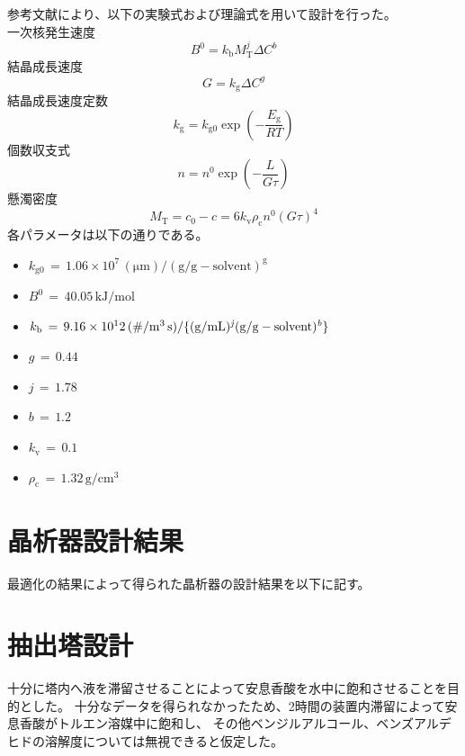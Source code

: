 \documentclass[a4j]{jsreport}
\begin{document}
参考文献\cite{晶析}により、以下の実験式および理論式を用いて設計を行った。\\
一次核発生速度
\begin{equation}
    B^0 = k_{\mathrm{ b}}M_{\mathrm{ T}}^j \Delta C^b
\end{equation}
結晶成長速度
\begin{equation}
    G = k_{\mathrm{ g}}\Delta C^g
\end{equation}
結晶成長速度定数
\begin{equation}
    k_{\mathrm{ g}} = k_{\mathrm{ g0}} \exp(-\frac{E_{\mathrm{ g}}}{RT})
\end{equation}
個数収支式
\begin{equation}
    n=n^0 \exp(-\frac{L}{G\tau})
\end{equation}
懸濁密度
\begin{equation}
    M_{\mathrm{ T}} = c_0-c = 6k_{\mathrm{ v}}\rho_{\mathrm{ c}}n^0(G\tau)^4
\end{equation}
各パラメータは以下の通りである。
\begin{itemize}
    \item[] $k_{\mathrm{ g0}}\,=\,1.06\times10^7\,\mathrm{ (\mu m)/(g/g-solvent)^g}$
    \item[] $B^{\mathrm{ 0}}\,=\,40.05\,\mathrm{ kJ/mol}$
    \item[] $k_{\mathrm{ b}}\,=\,9.16\times10^12\,\mathrm{ (\#/ m^3\,s)/\{(g/mL)^{{\it j}}(g/g-solvent)^{{\it b}}\}}$
    \item[] $g\,=\,0.44\,$
    \item[] $j\,=\,1.78\,$
    \item[] $b\,=\,1.2\,$
    \item[] $k_{\mathrm{ v}}\,=\,0.1\,$
    \item[] $\rho_{\mathrm{ c}}\,=\,1.32\,\mathrm{ g/cm^3}$ 
\end{itemize}

\section{晶析器設計結果}
最適化の結果によって得られた晶析器の設計結果を以下に記す。

\section{抽出塔設計}
十分に塔内へ液を滞留させることによって安息香酸を水中に飽和させることを目的とした。
十分なデータを得られなかったため、2時間の装置内滞留によって安息香酸がトルエン溶媒中に飽和し、
その他ベンジルアルコール、ベンズアルデヒドの溶解度については無視できると仮定した。
\end{document}
